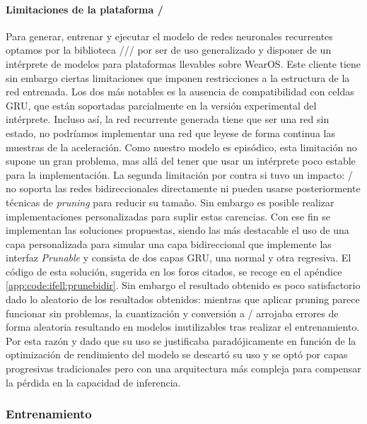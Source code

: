 \paragraph{Limitaciones de la plataforma \tflite/}\label{par:desc:modelo:rnn:limitaciones}
Para generar, entrenar y ejecutar el modelo de redes neuronales recurrentes optamos por la biblioteca \tensorflow//\tflite/ por ser de uso generalizado y disponer de un intérprete de modelos para plataformas llevables sobre WearOS. Este cliente tiene sin embargo ciertas limitaciones que imponen restricciones a la estructura de la red entrenada. Los dos más notables es la ausencia de compatibilidad con celdas GRU\cite{tfliteGru}, que están soportadas parcialmente en la versión experimental del intérprete. Incluso así, la red recurrente generada tiene que ser una red sin estado, no podríamos implementar una red que leyese de forma continua las muestras de la aceleración. Como nuestro modelo es episódico, esta limitación no supone un gran problema, mas allá del tener que usar un intérprete poco estable para la implementación. 
La segunda limitación por contra si tuvo un impacto: \tflite/ no soporta las redes bidireccionales directamente\cite{tfliteBidir} ni pueden usarse posteriormente técnicas de \textit{pruning} para reducir su tamaño\cite{tfPruneBidir}. Sin embargo es posible realizar implementaciones personalizadas para suplir estas carencias. Con ese fin se implementan las soluciones propuestas, siendo las más destacable el uso de una capa personalizada para simular una capa bidireccional que implemente las interfaz \textit{Prunable} y consista de dos capas GRU, una normal y otra regresiva. El código de esta solución, sugerida en los foros citados, se recoge en el apéndice \ref{app:code:ifell:prunebidir}. Sin embargo el resultado obtenido es poco satisfactorio dado lo aleatorio de los resultados obtenidos: mientras que aplicar pruning parece funcionar sin problemas, la cuantización y conversión a \tflite/ arrojaba errores de forma aleatoria resultando en modelos inutilizables tras realizar el entrenamiento. Por esta razón y dado que su uso se justificaba paradójicamente en función de la optimización de rendimiento del modelo se descartó su uso y se optó por capas progresivas tradicionales pero con una arquitectura más compleja para compensar la pérdida en la capacidad de inferencia.

\subsubsection{Entrenamiento}

